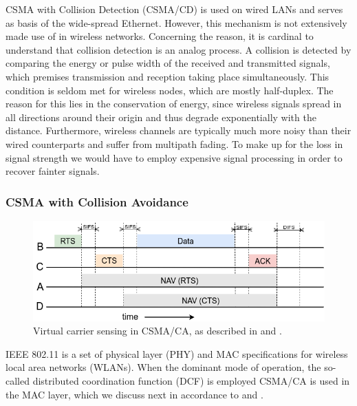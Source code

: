 CSMA with Collision Detection (CSMA/CD) is used on wired LANs and serves as basis of the wide-spread Ethernet. However, this mechanism is not extensively made use of in wireless networks. Concerning the reason, it is cardinal to understand that collision detection is an analog process. A collision is detected by comparing the energy or pulse width of the received and transmitted signals, which premises transmission and reception taking place simultaneously. This condition is seldom met for wireless nodes, which are mostly half-duplex. The reason for this lies in the conservation of energy, since wireless signals spread in all directions around their origin and thus degrade exponentially with the distance. Furthermore, wireless channels are typically much more noisy than their wired counterparts and suffer from multipath fading. To make up for the loss in signal strength we would have to employ expensive signal processing in order to recover fainter signals.

\subsubsection{CSMA with Collision Avoidance}
\label{sec:csma-ca}

\begin{figure}[tb]
	\label{fig:virtual_carrier_sensing}
	\begin{center}
		\includegraphics[width=14cm]{pictures/virtual_carrier_sensing}
	\end{center}
	\caption[Virtual carrier sensing in CSMA/CA]{Virtual carrier sensing in CSMA/CA, as described in \cite{Tanenbaum02} and \cite{Gast05}.}
\end{figure}

IEEE 802.11 is a set of physical layer (PHY) and MAC specifications for wireless local area networks (WLANs). When the dominant mode of operation, the so-called distributed coordination function (DCF) is employed CSMA/CA is used in the MAC layer, which we discuss next in accordance to \cite{Gast05} and \cite{Garg07}. 


